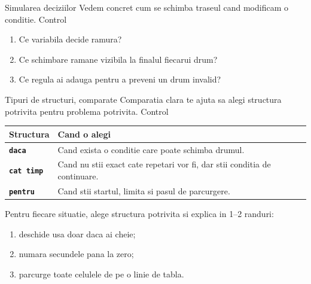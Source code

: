 \clearpage

\PageHeader
  {Simularea deciziilor}
  {Vedem concret cum se schimba traseul cand modificam o conditie.}
  {Control}


\begin{guidebox}
\begin{enumerate}
\item Ce variabila decide ramura?
\item Ce schimbare ramane vizibila la finalul fiecarui drum?
\item Ce regula ai adauga pentru a preveni un drum invalid?
\end{enumerate}
\end{guidebox}

\clearpage

\PageHeader
  {Tipuri de structuri, comparate}
  {Comparatia clara te ajuta sa alegi structura potrivita pentru problema potrivita.}
  {Control}

\begin{conceptbox}
\begin{tabularx}{\linewidth}{>{\bfseries}lX}
\toprule
Structura & Cand o alegi \\
\midrule
\texttt{daca} & Cand exista o conditie care poate schimba drumul. \\
\texttt{cat timp} & Cand nu stii exact cate repetari vor fi, dar stii conditia de continuare. \\
\texttt{pentru} & Cand stii startul, limita si pasul de parcurgere. \\
\bottomrule
\end{tabularx}
\end{conceptbox}

\begin{semibox}
Pentru fiecare situatie, alege structura potrivita si explica in 1--2 randuri:
\begin{enumerate}
\item deschide usa doar daca ai cheie;
\item numara secundele pana la zero;
\item parcurge toate celulele de pe o linie de tabla.
\end{enumerate}
\end{semibox}

\clearpage
